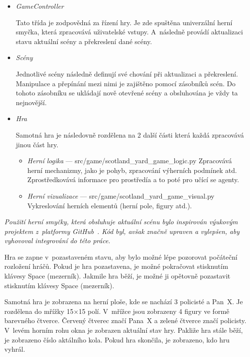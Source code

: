 \begin{itemize}
  \item \emph{GameController}~\cite{GameSceneController}
  
  Tato třída je zodpovědná za řízení hry.
  Je zde spuštěna univerzální herní smyčka, která zpracovává uživatelské vstupy.
  A~následně provádí aktualizaci stavu aktuální scény a překreslení dané scény.
  \item \emph{Scény}~\cite{GameSceneController}
  
  Jednotlivé scény následně definují své chování při aktualizaci a překreslení.
  Manipulace a přepínání mezi nimi je zajištěno pomocí zásobníků scén.
  Do tohoto zásobníku se ukládají nově otevřené scény a obsluhována je vždy ta nejnovější.

  \item \emph{Hra}

    Samotná hra je následovně rozdělena na 2 další části která každá zpracovává jinou část hry.\vspace{-0.5em}
    \begin{itemize}
      \item \emph{Herní logika} --- src/game/scotland\_yard\_game\_logic.py
      Zpracovává herní mechanizmy, jako je pohyb, zpracování výherních podmínek atd.
      Zprostředkovává informace pro prostředía a to poté pro učící se agenty.

      \item \emph{Herní vizualizace} ---  src/game/scotland\_yard\_game\_visual.py
      Vykreslování herních elementů (herní pole, figury atd.).
    \end{itemize}
\end{itemize}

\textit{Použití herní smyčky, která obsluhuje aktuální scénu bylo inspirován výukovým projektem z~platformy GitHub~\cite{GameSceneController}.
Kód byl, avšak značně upraven a vylepšen, aby vyhovoval integrování do této práce.}

Hra se zapne v~pozastaveném stavu, aby bylo možné lépe pozorovat počáteční rozložení hráčů.
Pokud je hra pozastavena, je možné pokračovat stisknutím klávesy Space (mezerník).
Jakmile hra běží, je možné ji opětovně pozastavit stisknutím klávesy Space (mezerník).

Samotná hra je zobrazena na herní ploše, kde se nachází 3 policisté a Pan~X\@.
Je rozdělena do mřížky 15$\times$15 polí.
V~mřížce jsou zobrazeny 4 figury ve formě barevného čtverce.
Červený čtverec značí Pana~X a zelené čtverce značí policisty.
V~levém horním rohu okna je zobrazen aktuální stav hry.
Pakliže hra stále běží, je zobrazeno číslo aktálního kola.
Pokud hra skončila, je zobrazeno, kdo hru vyhrál.

